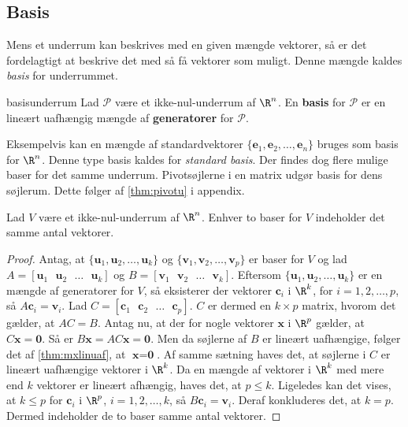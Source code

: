 \subsection{Basis}
Mens et underrum kan beskrives med en given mængde vektorer, så er det fordelagtigt at beskrive det med så få vektorer som muligt. 
Denne mængde kaldes \textit{basis} for underrummet.
%
\begin{defn}{}{basisunderrum}
Lad $\mathcal{P}$ være et ikke-nul-underrum af $\R^n$. 
En \textbf{basis} for $\mathcal{P}$ er en lineært uafhængig mængde af \textbf{generatorer} for $\mathcal{P}$.
\end{defn}
\noindent
Eksempelvis kan en mængde af standardvektorer $\{\textbf{e}_1,\textbf{e}_2,\ldots,\textbf{e}_n\}$ bruges som basis for $\R^n$.
Denne type basis kaldes for \textit{standard basis}.
Der findes dog flere mulige baser for det samme underrum.
%
Pivotsøjlerne i en matrix udgør basis for dens søjlerum.
Dette følger af \ref{thm:pivotu} i appendix.
%
\begin{thm}{}{}
Lad $V$ være et ikke-nul-underrum af $\R^n$. Enhver to baser for $V$ indeholder det samme antal vektorer.
\end{thm}
\begin{proof}
Antag, at $\{\textbf{u}_1,\textbf{u}_2,\ldots,\textbf{u}_k\} $ og $\{\textbf{v}_1,\textbf{v}_2,\ldots,\textbf{v}_p\} $ er baser for $V$ og lad $A=[\textbf{u}_1 \text{ } \textbf{u}_2 \text{ }  \ldots \text{ } \textbf{u}_k] $ og $B=[\textbf{v}_1 \text{ } \textbf{v}_2 \text{ }  \ldots \text{ } \textbf{v}_k] $.
Eftersom $\{\textbf{u}_1,\textbf{u}_2,\ldots,\textbf{u}_k\} $ er en mængde af generatorer for $V$, så eksisterer der vektorer $\textbf{c}_i$ i $\R^k$, for $i=1,2,\ldots,p$, så $A\textbf{c}_i=\textbf{v}_i$.
Lad $C=[\textbf{c}_1 \text{ } \textbf{c}_2 \text{ } \ldots \text{ } \textbf{c}_p]$.
$C$ er dermed en $ k \times p$ matrix, hvorom det gælder, at $AC=B$.
Antag nu, at der for nogle vektorer $\textbf{x}$ i $\R^p$ gælder, at $C\textbf{x}=\textbf{0}$. 
Så er $B\textbf{x}=AC\textbf{x}=\textbf{0}$. 
Men da søjlerne af $B$ er lineært uafhængige, følger det af \ref{thm:mxlinuaf}, at $\textbf{x}=\textbf{0}$.
Af samme sætning haves det, at søjlerne i $C$ er lineært uafhængige vektorer i $\R^k$.
Da en mængde af vektorer i $\R^k$ med mere end $k$ vektorer er lineært afhængig, haves det, at $p\leq k$. 
Ligeledes kan det vises, at $k \leq p$ for $\textbf{c}_i$ i $\R^p$, $i=1,2,\ldots,k$, så $B\textbf{c}_i=\textbf{v}_i$. 
Deraf konkluderes det, at $k=p$.
Dermed indeholder de to baser samme antal vektorer. 
\end{proof}